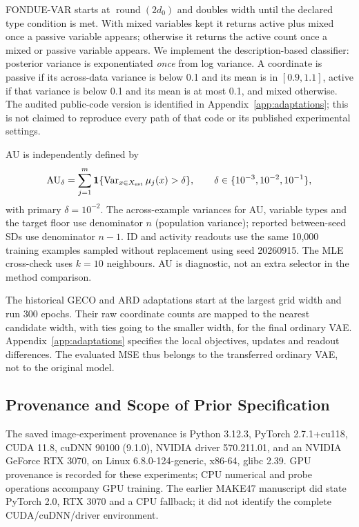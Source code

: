 \documentclass[make,article,submit,pdftex,moreauthors]{Definitions/mdpi}
\begin{document}
FONDUE-VAR starts at $\operatorname{round}(2d_0)$ and doubles width until
the declared type condition is met. With mixed variables kept it returns
active plus mixed once a passive variable appears; otherwise it returns
the active count once a mixed or passive variable appears. We implement
the description-based classifier: posterior variance is exponentiated
\emph{once} from log variance. A coordinate is passive if its across-data
variance is below 0.1 and its mean is in $[0.9,1.1]$, active if that
variance is below 0.1 and its mean is at most 0.1, and mixed otherwise.
The audited public-code version is identified in
Appendix~\ref{app:adaptations}; this is not claimed to reproduce every
path of that code or its published experimental settings.

AU is independently defined by
\begin{equation}
 \mathrm{AU}_\delta=\sum_{j=1}^{m}
 \mathbf1\{\operatorname{Var}_{x\in X_{\rm est}}\mu_j(x)>\delta\},
 \qquad \delta\in\{10^{-3},10^{-2},10^{-1}\},
 \label{eq:au}
\end{equation}
with primary $\delta=10^{-2}$. The across-example variances for AU,
variable types and the target floor use denominator $n$ (population
variance); reported between-seed SDs use denominator $n-1$.
ID and activity readouts use the same
10,000 training examples sampled without replacement using seed
20260915. The MLE cross-check uses $k=10$ neighbours. AU is diagnostic,
not an extra selector in the method comparison.

The historical GECO and ARD adaptations start at the largest grid width and run
300 epochs. Their raw coordinate counts are mapped to the nearest
candidate width, with ties going to the smaller width, for the final
ordinary VAE. Appendix~\ref{app:adaptations} specifies the local
objectives, updates and readout differences. The evaluated MSE thus
belongs to the transferred ordinary VAE, not to the original model.

\subsection{Provenance and Scope of Prior Specification}\label{sec:provenance}
The saved image-experiment provenance is Python 3.12.3, PyTorch
2.7.1+cu118, CUDA 11.8, cuDNN 90100 (9.1.0), NVIDIA driver 570.211.01,
and an NVIDIA GeForce RTX 3070, on Linux 6.8.0-124-generic, x86-64,
glibc 2.39. GPU provenance is recorded for these experiments; CPU
numerical and probe operations accompany GPU training. The earlier
MAKE47 manuscript did state PyTorch 2.0, RTX 3070 and a CPU fallback;
it did not identify the complete CUDA/cuDNN/driver environment.
\end{document}
